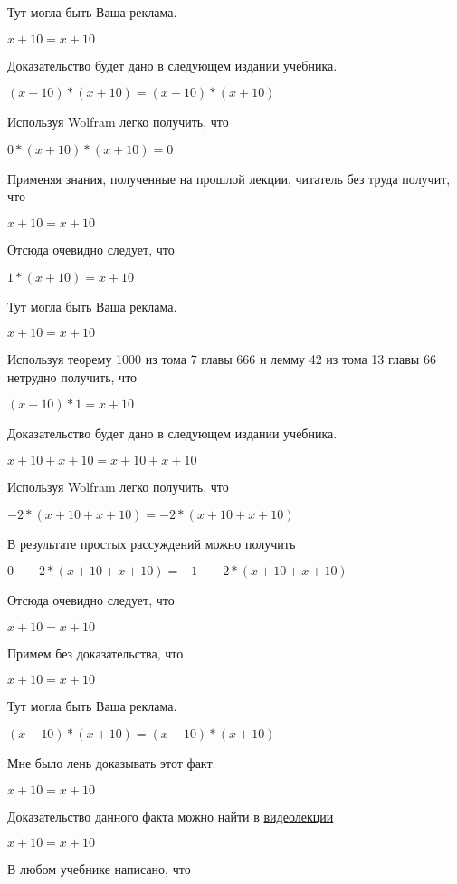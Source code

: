 \documentclass[12pt,a4paper,fleqn]{article}
\theoremstyle{definition}
\begin{document}
Тут могла быть Ваша реклама. 

$ x  +  10  =  x  +  10 $

Доказательство будет дано в следующем издании учебника. 

$( x  +  10 ) * ( x  +  10 ) = ( x  +  10 ) * ( x  +  10 )$

Используя Wolfram легко получить, что 

$ 0  * ( x  +  10 ) * ( x  +  10 ) =  0 $

Применяя знания, полученные на прошлой лекции, читатель без труда получит, что 

$ x  +  10  =  x  +  10 $

Отсюда очевидно следует, что 

$ 1  * ( x  +  10 ) =  x  +  10 $

Тут могла быть Ваша реклама. 

$ x  +  10  =  x  +  10 $

Используя теорему 1000 из тома 7 главы 666 и лемму 42 из тома 13 главы 66 нетрудно получить, что 

$( x  +  10 ) *  1  =  x  +  10 $

Доказательство будет дано в следующем издании учебника. 

$ x  +  10  +  x  +  10  =  x  +  10  +  x  +  10 $

Используя Wolfram легко получить, что 

$ -2  * ( x  +  10  +  x  +  10 ) =  -2  * ( x  +  10  +  x  +  10 )$

В результате простых рассуждений можно получить 

$ 0  -  -2  * ( x  +  10  +  x  +  10 ) =  -1  -  -2  * ( x  +  10  +  x  +  10 )$

Отсюда очевидно следует, что 

$ x  +  10  =  x  +  10 $

Примем без доказательства, что 

$ x  +  10  =  x  +  10 $

Тут могла быть Ваша реклама. 

$( x  +  10 ) * ( x  +  10 ) = ( x  +  10 ) * ( x  +  10 )$

Мне было лень доказывать этот факт.

$ x  +  10  =  x  +  10 $

Доказательство данного факта можно найти в \href{https://www.youtube.com/watch?v=dQw4w9WgXcQ}{видеолекции} 

$ x  +  10  =  x  +  10 $

В любом учебнике написано, что 
\end{document}
